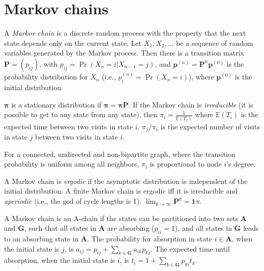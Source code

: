 \section{Markov chains}
A \emph{Markov chain} is a discrete random process with the property that the next state depends only on the current state.
Let $X_1,X_2,\ldots$ be a sequence of random variables generated by the Markov process.
Then there is a transition matrix $\mathbf{P} = (p_{ij})$, with $p_{ij} = \Pr(X_n = i | X_{n-1} = j)$,
and $\mathbf{p}^{(n)} = \mathbf P^n \mathbf p^{(0)}$ is the probability distribution for $X_n$ (i.e., $p^{(n)}_i = \Pr(X_n = i)$),
where $\mathbf{p}^{(0)}$ is the initial distribution.

$\mathbf{\pi}$ is a stationary distribution if $\mathbf{\pi} = \mathbf{\pi P}$.
If the Markov chain is \emph{irreducible} (it is possible to get to any state from any state),
then $\pi_i = \frac{1}{\mathbb{E}(T_i)}$ where $\mathbb{E}(T_i)$  is the expected time between two visits in state $i$.
$\pi_j/\pi_i$ is the expected number of visits in state $j$ between two visits in state $i$.

For a connected, undirected and non-bipartite graph, where the transition probability is uniform among all neighbors, $\pi_i$ is proportional to node $i$'s degree.

A Markov chain is \emph{ergodic} if the asymptotic distribution is independent of the initial distribution.
A finite Markov chain is ergodic iff it is irreducible and \emph{aperiodic} (i.e., the gcd of cycle lengths is 1).
$\lim_{k\rightarrow\infty}\mathbf{P}^k = \mathbf{1}\pi$.

A Markov chain is an A-chain if the states can be partitioned into two sets $\mathbf{A}$ and $\mathbf{G}$, such that all states in $\mathbf{A}$ are absorbing ($p_{ii}=1$), and all states in $\mathbf{G}$ leads to an absorbing state in $\mathbf{A}$.
The probability for absorption in state $i\in\mathbf{A}$, when the initial state is $j$, is $a_{ij} = p_{ij}+\sum_{k\in\mathbf{G}} a_{ik}p_{kj}$.
The expected time until absorption, when the initial state is $i$, is $t_i = 1+\sum_{k\in\mathbf{G}}p_{ki}t_k$.

